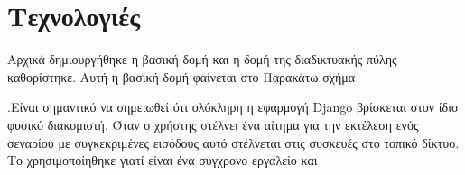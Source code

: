 \chapter{Τεχνολογιές}


Αρχικά δημιουργήθηκε η βασική δομή και η δομή της διαδικτυακής πύλης καθορίστηκε. Αυτή η βασική δομή φαίνεται στο Παρακάτω σχήμα

.Είναι σημαντικό να σημειωθεί ότι ολόκληρη η εφαρμογή Django βρίσκεται στον ίδιο φυσικό
διακομιστή. Όταν ο χρήστης στέλνει ένα αίτημα για την εκτέλεση ενός σεναρίου με συγκεκριμένες εισόδους αυτό στέλνεται στις συσκευές στο τοπικό δίκτυο.
Το  χρησιμοποίηθηκε γιατί είναι ένα σύγχρονο εργαλείο και 
